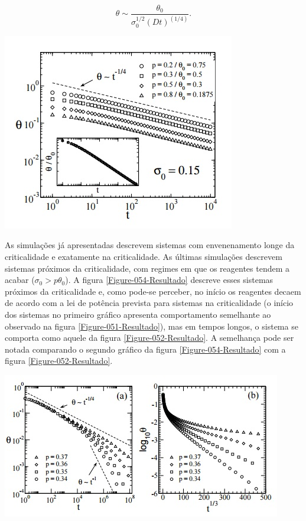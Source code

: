 \begin{equation}
	\theta \sim \dfrac{\theta_0}{\sigma_0^{1/2}(Dt)^(1/4)}.
	\label{Equation-051-Eq}
\end{equation}

{ \centering
	\captionsetup{type=figure}
	\includegraphics[width=\columnwidth]{./figures/051-Resultado.jpg}
	\label{Figure-051-Resultado}
}

As simulações já apresentadas descrevem sistemas com envenenamento longe da
criticalidade e exatamente na criticalidade. As últimas simulações descrevem
sistemas próximos da criticalidade, com regimes em que os reagentes tendem a
acabar ($\sigma_0 > p \theta_0$). A figura \ref{Figure-054-Resultado} descreve
esses sistemas próximos da criticalidade e, como pode-se perceber, no início os
reagentes decaem de acordo com a lei de potência prevista para sistemas na
criticalidade (o início dos sistemas no primeiro gráfico apresenta comportamento
semelhante ao observado na figura \ref{Figure-051-Resultado}), mas em tempos
longos, o sistema se comporta como aquele da figura \ref{Figure-052-Resultado}.
A semelhança pode ser notada comparando o segundo gráfico da figura
\ref{Figure-054-Resultado} com a figura \ref{Figure-052-Resultado}.

{ \centering
	\captionsetup{type=figure}
	\includegraphics[width=\columnwidth]{./figures/054-Resultado.jpg}
	\label{Figure-054-Resultado}
}
